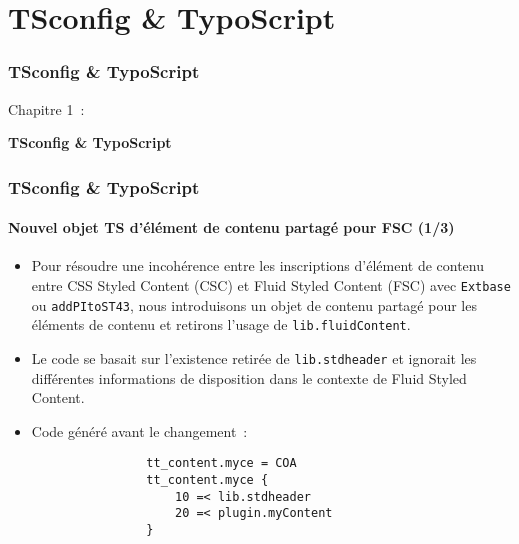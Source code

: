 %

\section{TSconfig \& TypoScript}
\begin{frame}[fragile]
	\frametitle{TSconfig \& TypoScript}

	\begin{center}\huge{Chapitre 1~:}\end{center}
	\begin{center}\huge{\color{typo3darkgrey}\textbf{TSconfig \& TypoScript}}\end{center}

\end{frame}


\begin{frame}[fragile]
	\frametitle{TSconfig \& TypoScript}
	\framesubtitle{Nouvel objet TS d'élément de contenu partagé pour FSC (1/3)}

	\begin{itemize}
		\item Pour résoudre une incohérence entre les inscriptions d'élément de contenu entre
			CSS Styled Content (CSC) et Fluid Styled Content (FSC) avec \texttt{Extbase} ou
			\texttt{addPItoST43}, nous introduisons un objet de contenu partagé pour les
			éléments de contenu et retirons l'usage de \texttt{lib.fluidContent}.

		\item Le code se basait sur l'existence retirée de \texttt{lib.stdheader} et ignorait
			les différentes informations de disposition dans le contexte de Fluid Styled Content.

		\item Code généré avant le changement~:

			\begin{lstlisting}
				tt_content.myce = COA
				tt_content.myce {
				    10 =< lib.stdheader
				    20 =< plugin.myContent
				}
			\end{lstlisting}

	\end{itemize}

\end{frame}

